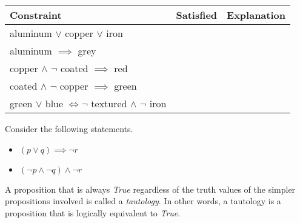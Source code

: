 \documentclass[addpoints]{exam}
\begin{document}
\begin{questions}
\begin{solution}
    \begin{tabularx}{\textwidth}{l|l|X}
      Constraint & Satisfied & Explanation \\\hline
      aluminum $\lor$ copper $\lor$ iron & & \\
      aluminum $\implies$ grey & & \\
      copper $\land$ $\neg$ coated $\implies$ red & & \\
      coated $\land$ $\neg$ copper $\implies$ green & & \\
      green $\lor$ blue $\iff \neg$ textured $\land$ $\neg$ iron & & 
    \end{tabularx}
  \end{solution}
  
\question Consider the following statements.
  \begin{itemize}
  \item $ (p \lor q) \implies \neg r$
  \item $(\neg p \land \neg q) \land \neg r$
  \end{itemize}

  
\question A proposition that is always \textit{True} regardless of the truth values of the simpler propositions involved is called a \textit{tautology}. In other words, a tautology is a proposition that is logically equivalent to \textit{True}.
\end{questions}
\end{document}
